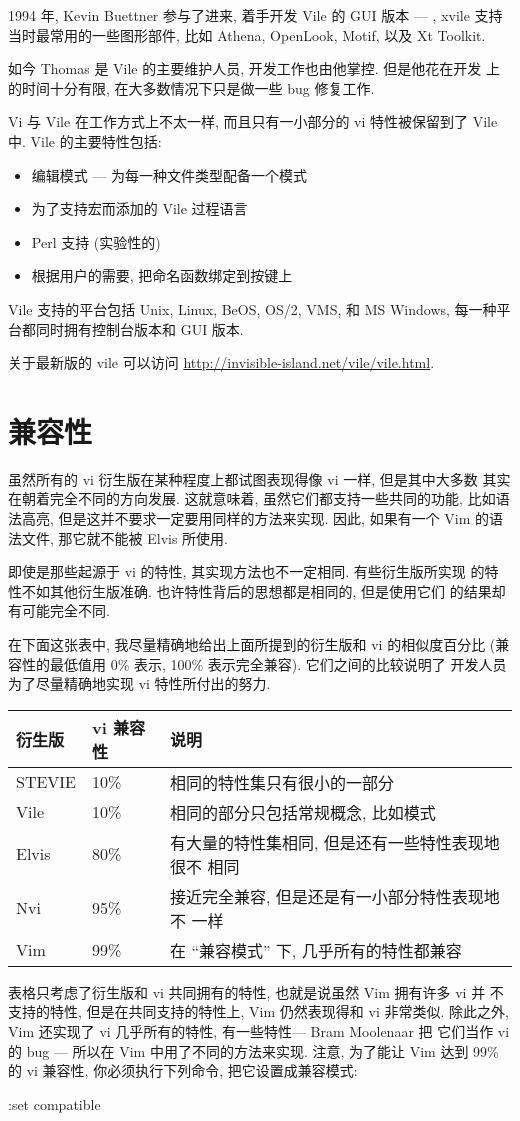 1994 年, Kevin Buettner 参与了进来, 着手开发 Vile 的 GUI 版本 ---
, xvile 支持当时最常用的一些图形部件, 比如 Athena,
OpenLook, Motif, 以及 Xt Toolkit.

如今 Thomas 是 Vile 的主要维护人员, 开发工作也由他掌控. 但是他花在开发
上的时间十分有限, 在大多数情况下只是做一些 bug 修复工作.

Vi 与 Vile 在工作方式上不太一样, 而且只有一小部分的 vi 特性被保留到了
Vile 中. Vile 的主要特性包括:
\begin{itemize}
    \item 编辑模式 --- 为每一种文件类型配备一个模式
    \item 为了支持宏而添加的 Vile  过程语言
    \item Perl 支持 (实验性的)
    \item 根据用户的需要, 把命名函数绑定到按键上
\end{itemize}

Vile 支持的平台包括 Unix, Linux, BeOS, OS/2, VMS, 和 MS Windows,
每一种平台都同时拥有控制台版本和 GUI 版本.
\begin{warning}
    关于最新版的 vile 可以访问
    \url{http://invisible-island.net/vile/vile.html}.
\end{warning}

\section{兼容性}
\label{sec:compatibility}
虽然所有的 vi 衍生版在某种程度上都试图表现得像 vi 一样, 但是其中大多数
其实在朝着完全不同的方向发展. 这就意味着, 虽然它们都支持一些共同的功能,
比如语法高亮, 但是这并不要求一定要用同样的方法来实现. 因此, 如果有一个 
Vim 的语法文件, 那它就不能被 Elvis 所使用.

即使是那些起源于 vi 的特性, 其实现方法也不一定相同. 有些衍生版所实现
的特性不如其他衍生版准确. 也许特性背后的思想都是相同的, 但是使用它们
的结果却有可能完全不同.

在下面这张表中, 我尽量精确地给出上面所提到的衍生版和 vi 的相似度百分比
(兼容性的最低值用 0\% 表示, 100\% 表示完全兼容). 它们之间的比较说明了
开发人员为了尽量精确地实现 vi 特性所付出的努力.

\begin{tabular}{lll}
    \hline
    \textbf{衍生版}  & \textbf{vi 兼容性} & \textbf{说明} \\
    \hline
    STEVIE  & 10\%      & 相同的特性集只有很小的一部分 \\
    Vile    & 10\%      & 相同的部分只包括常规概念, 比如模式 \\
    Elvis   & 80\%      & 有大量的特性集相同, 但是还有一些特性表现地很不
        相同 \\
    Nvi     & 95\%      & 接近完全兼容, 但是还是有一小部分特性表现地不
        一样 \\
    Vim     & 99\%      & 在 ``兼容模式'' 下, 几乎所有的特性都兼容 \\
    \hline
\end{tabular}

表格只考虑了衍生版和 vi 共同拥有的特性, 也就是说虽然 Vim 拥有许多 vi 并
不支持的特性, 但是在共同支持的特性上, Vim 仍然表现得和 vi 非常类似.
除此之外, Vim 还实现了 vi 几乎所有的特性, 有一些特性--- Bram Moolenaar 把
它们当作 vi 的 bug --- 所以在 Vim 中用了不同的方法来实现. 注意, 为了能让
Vim 达到 99\% 的 vi 兼容性, 你必须执行下列命令, 把它设置成兼容模式:
\begin{vimcmd}
:set compatible
\end{vimcmd}
